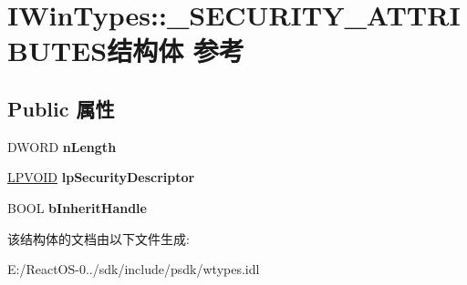 \hypertarget{struct_i_win_types_1_1___s_e_c_u_r_i_t_y___a_t_t_r_i_b_u_t_e_s}{}\section{I\+Win\+Types\+:\+:\+\_\+\+S\+E\+C\+U\+R\+I\+T\+Y\+\_\+\+A\+T\+T\+R\+I\+B\+U\+T\+E\+S结构体 参考}
\label{struct_i_win_types_1_1___s_e_c_u_r_i_t_y___a_t_t_r_i_b_u_t_e_s}
\subsection*{Public 属性}
\begin{DoxyCompactItemize}
\item 
\mbox{\label{struct_i_win_types_1_1___s_e_c_u_r_i_t_y___a_t_t_r_i_b_u_t_e_s_a5edcb7f77a78de034f4cefd8d76d7d1f}} 
D\+W\+O\+RD {\bfseries n\+Length}
\item 
\mbox{\label{struct_i_win_types_1_1___s_e_c_u_r_i_t_y___a_t_t_r_i_b_u_t_e_s_afe022f90dc26ad57c63f6cb4b9fef5f3}} 
\hyperlink{interfacevoid}{L\+P\+V\+O\+ID} {\bfseries lp\+Security\+Descriptor}
\item 
\mbox{\label{struct_i_win_types_1_1___s_e_c_u_r_i_t_y___a_t_t_r_i_b_u_t_e_s_acd6e259e6db5de5b432c8717b4a5a274}} 
B\+O\+OL {\bfseries b\+Inherit\+Handle}
\end{DoxyCompactItemize}


该结构体的文档由以下文件生成\+:\begin{DoxyCompactItemize}
\item 
E\+:/\+React\+O\+S-\/0../sdk/include/psdk/wtypes.\+idl\end{DoxyCompactItemize}
